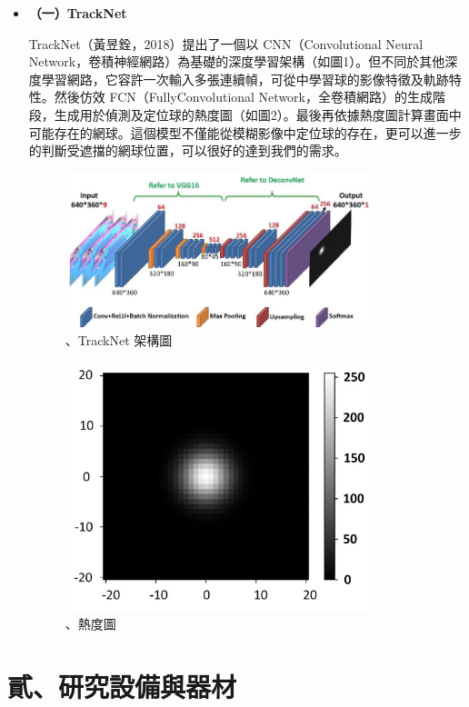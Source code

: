 \begin{itemize}
    \setlength\parindent{2em}
    \item []
    \textbf{（一）TrackNet}

    TrackNet（黃昱銓，2018）提出了一個以 CNN（Convolutional Neural Network，卷積神經網路）為基礎的深度學習架構（如圖1）。但不同於其他深度學習網路，它容許一次輸入多張連續幀，可從中學習球的影像特徵及軌跡特性。然後仿效 FCN（FullyConvolutional Network，全卷積網路）的生成階段，生成用於偵測及定位球的熱度圖（如圖2）。最後再依據熱度圖計算畫面中可能存在的網球。這個模型不僅能從模糊影像中定位球的存在，更可以進一步的判斷受遮擋的網球位置，可以很好的達到我們的需求。

    \begin{figure}
        \includegraphics[width = 9cm]{picture/TrackNet 架構圖.jpg}\\
        \caption{、TrackNet 架構圖}
        \label{TrackNet 架構圖}
        
        \includegraphics[width = 9cm]{picture/熱度圖.jpg}
        \caption{、熱度圖}
        \label{熱度圖}
    \end{figure}
\end{itemize}

\section{貳、研究設備與器材}

